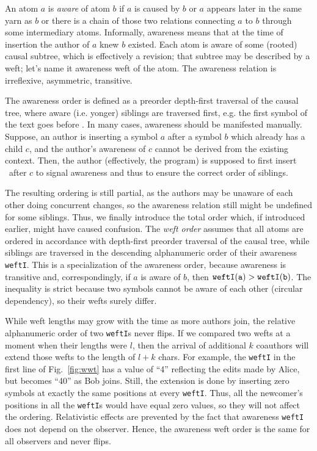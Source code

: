 \documentclass{sig-alternate}
\begin{document}
An atom $a$ is \emph{aware} of atom $b$ if $a$ is caused by $b$ or $a$ appears later in the same yarn as $b$ or there is a chain of those two relations connecting $a$ to $b$ through some intermediary atoms.
Informally, awareness means that at the time of insertion the author of $a$ knew $b$ existed. 
Each atom is aware of some (rooted) causal subtree, which is effectively a revision; that subtree may be described by a weft; let's name it awareness weft of the atom.
The awareness relation is irreflexive, asymmetric, transitive.

The awareness order is  defined as a preorder depth-first traversal of the causal tree, where aware (i.e. yonger) siblings are traversed first, e.g. the first symbol of the text goes before \eoa.
In many cases, awareness should be manifested manually.
Suppose, an author is inserting a symbol $a$ after a symbol $b$ which already has a child $c$, and the author's awareness of $c$ cannot be derived from the existing context.
Then, the author (effectively, the program) is supposed to first insert \zero ~after $c$ to signal awareness and thus to ensure the correct order of siblings.

The resulting ordering is still partial, as the authors may be unaware of each other doing concurrent changes, so the awareness relation still might be undefined for some siblings.
Thus, we finally introduce the total order which, if introduced earlier, might have caused confusion.
The \emph{weft order} assumes that all atoms are ordered in accordance with depth-first preorder traversal of the causal tree, while siblings are traversed in the descending  alphanumeric order of their awareness {\tt weftI}.
This is a specialization of the awareness order, because awareness is transitive and, correspondingly, if $a$ is aware of $b$, then $\tt weftI(a) > weftI(b)$.
The inequality is strict because two symbols cannot be aware of each other (circular dependency), so their wefts surely differ.

While weft lengths may grow with the time as more authors join, the relative alphanumeric order of two {\tt weftI}s never flips.
If we compared two wefts at a moment when their lengths were $l$, then the arrival of additional $k$ coauthors will extend those wefts to the length of $l+k$ chars.
For example, the {\tt weftI} in the first line of Fig.~\ref{fig:wwt} has a value of ``4'' reflecting the edits made by Alice, but becomes ``40'' as Bob joins.
Still, the extension is done by inserting zero symbols at exactly the same positions at every {\tt weftI}. %
Thus, all the newcomer's positions in all the {\tt weftI}s would have equal zero values, so they will not affect the ordering.
Relativistic effects are prevented by the fact that awareness {\tt weftI} does not depend on the observer.
Hence, the awareness weft order is the same for all observers and never flips.
\end{document}
